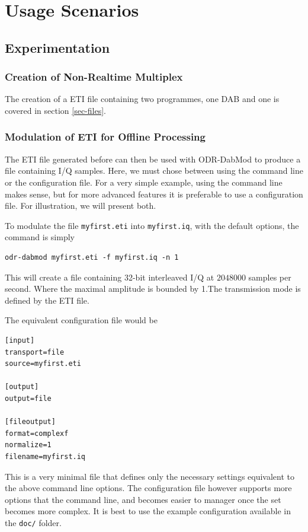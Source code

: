 \section{Usage Scenarios}
\subsection{Experimentation}
\subsubsection{Creation of Non-Realtime Multiplex}
The creation of a ETI file containing two programmes, one DAB and one
\dabplus{} is covered in section \ref{sec-files}.

\subsubsection{Modulation of ETI for Offline Processing}
The ETI file generated before can then be used with ODR-DabMod to produce a
file containing I/Q samples. Here, we must chose between using the command line
or the configuration file. For a very simple example, using the command line
makes sense, but for more advanced features it is preferable to use a
configuration file. For illustration, we will present both.

To modulate the file \texttt{myfirst.eti} into \texttt{myfirst.iq}, with the
default options, the command is simply

\begin{lstlisting}
odr-dabmod myfirst.eti -f myfirst.iq -n 1
\end{lstlisting}

This will create a file containing 32-bit interleaved I/Q at $2048000$ samples
per second. Where the maximal amplitude is bounded by 1.The transmission mode
is defined by the ETI file.

The equivalent configuration file would be
\begin{lstlisting}
[input]
transport=file
source=myfirst.eti

[output]
output=file

[fileoutput]
format=complexf
normalize=1
filename=myfirst.iq
\end{lstlisting}

This is a very minimal file that defines only the necessary settings equivalent
to the above command line options. The configuration file however supports more
options that the command line, and becomes easier to manager once the set
becomes more complex. It is best to use the example configuration available in
the \texttt{doc/} folder.

